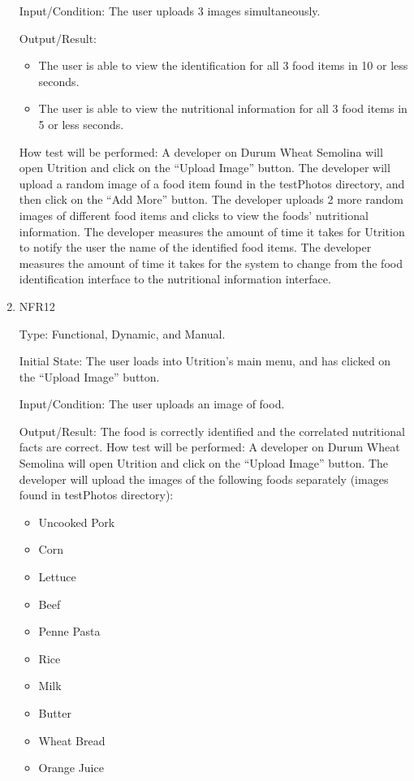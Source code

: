 \documentclass[12pt, titlepage]{article}
\begin{document}
\begin{enumerate}
		Input/Condition: The user uploads 3 images simultaneously.
		
		Output/Result: 
		\begin{itemize}
			\item The user is able to view the identification for all 3 food items in 10 or less seconds.
			\item The user is able to view the nutritional information for all 3 food items in 5 or less seconds.
		\end{itemize}
		
		How test will be performed: A developer on Durum Wheat Semolina will open Utrition and click on the “Upload Image” button. The developer will upload a random image of a food item found in the testPhotos directory, and then click on the “Add More” button. The developer uploads 2 more random images of different food items and clicks to view the foods’ nutritional information. The developer measures the amount of time it takes for Utrition to notify the user the name of the identified food items. The developer measures the amount of time it takes for the system to change from the food identification interface to the nutritional information interface.
		
		\item{NFR12\\} 
		
		Type: Functional, Dynamic, and Manual.
		
		Initial State: The user loads into Utrition’s main menu, and has clicked on the “Upload Image” 
		button.
		
		Input/Condition: The user uploads an image of food.
		
		Output/Result: The food is correctly identified and the correlated nutritional facts are correct.
		How test will be performed: A developer on Durum Wheat Semolina will open Utrition and click on the “Upload Image” button. The developer will upload the images of the following foods separately (images found in testPhotos directory):
		\begin{itemize}
			\item Uncooked Pork
			\item Corn
			\item Lettuce
			\item Beef
			\item Penne Pasta
			\item Rice
			\item Milk
			\item Butter
			\item Wheat Bread
			\item Orange Juice
		\end{itemize} 
		

\end{enumerate}
\end{document}
